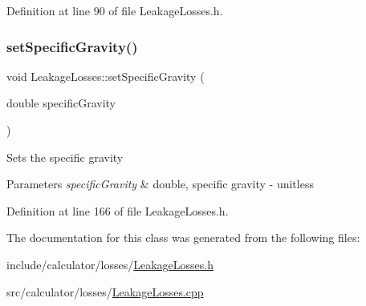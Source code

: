 Definition at line 90 of file Leakage\+Losses.\+h.

\mbox{\label{class_leakage_losses_ab017828413655c5903374564e8718fac}} 
\subsubsection{\texorpdfstring{set\+Specific\+Gravity()}{setSpecificGravity()}}
{\footnotesize\ttfamily void Leakage\+Losses\+::set\+Specific\+Gravity (\begin{DoxyParamCaption}\item[{double}]{specific\+Gravity }\end{DoxyParamCaption})\hspace{0.3cm}{\ttfamily [inline]}}

Sets the specific gravity


\begin{DoxyParams}{Parameters}
{\em specific\+Gravity} & double, specific gravity -\/ unitless \\
\hline
\end{DoxyParams}


Definition at line 166 of file Leakage\+Losses.\+h.



The documentation for this class was generated from the following files\+:\begin{DoxyCompactItemize}
\item 
include/calculator/losses/\hyperlink{_leakage_losses_8h}{Leakage\+Losses.\+h}\item 
src/calculator/losses/\hyperlink{_leakage_losses_8cpp}{Leakage\+Losses.\+cpp}\end{DoxyCompactItemize}
